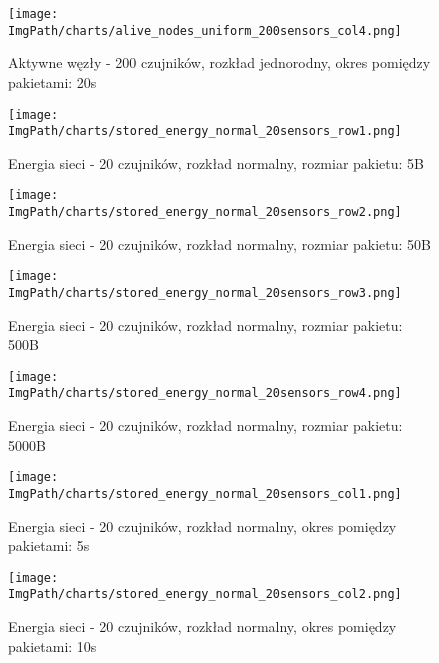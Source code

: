 \documentclass[a4paper,12pt,twoside,openany]{report}
\newcommand{\ImgPath}{./img}
\begin{document}
\begin{figure}[H]
	\begin{center}
		\texttt{[image: \\ImgPath/charts/alive\_nodes\_uniform\_200sensors\_col4.png]}
	\end{center}
	\caption{Aktywne węzły - 200 czujników, rozkład jednorodny, okres pomiędzy pakietami: 20s}
\end{figure}

\begin{figure}[H]
	\begin{center}
		\texttt{[image: \\ImgPath/charts/stored\_energy\_normal\_20sensors\_row1.png]}
	\end{center}
	\caption{Energia sieci - 20 czujników, rozkład normalny, rozmiar pakietu: 5B}
\end{figure}

\begin{figure}[H]
	\begin{center}
		\texttt{[image: \\ImgPath/charts/stored\_energy\_normal\_20sensors\_row2.png]}
	\end{center}
	\caption{Energia sieci - 20 czujników, rozkład normalny, rozmiar pakietu: 50B}
\end{figure}

\begin{figure}[H]
	\begin{center}
		\texttt{[image: \\ImgPath/charts/stored\_energy\_normal\_20sensors\_row3.png]}
	\end{center}
	\caption{Energia sieci - 20 czujników, rozkład normalny, rozmiar pakietu: 500B}
\end{figure}

\begin{figure}[H]
	\begin{center}
		\texttt{[image: \\ImgPath/charts/stored\_energy\_normal\_20sensors\_row4.png]}
	\end{center}
	\caption{Energia sieci - 20 czujników, rozkład normalny, rozmiar pakietu: 5000B}
\end{figure}

\begin{figure}[H]
	\begin{center}
		\texttt{[image: \\ImgPath/charts/stored\_energy\_normal\_20sensors\_col1.png]}
	\end{center}
	\caption{Energia sieci - 20 czujników, rozkład normalny, okres pomiędzy pakietami: 5s}
\end{figure}

\begin{figure}[H]
	\begin{center}
		\texttt{[image: \\ImgPath/charts/stored\_energy\_normal\_20sensors\_col2.png]}
	\end{center}
	\caption{Energia sieci - 20 czujników, rozkład normalny, okres pomiędzy pakietami: 10s}
\end{figure}
\end{document}
